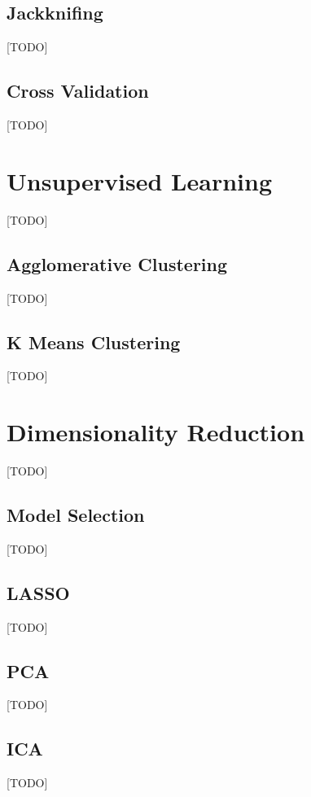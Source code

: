 \documentclass[12pt,a4paper]{article}
\theoremstyle{plain}
\theoremstyle{definition}
\begin{document}
\subsection{Jackknifing}
\label{sec:jackknife}
[TODO]




\subsection{Cross Validation}
\label{sec:cv}
[TODO]


\section{Unsupervised Learning}
\label{sec:unsupervised}
[TODO]


\subsection{Agglomerative Clustering}
[TODO]

\subsection{K Means Clustering}
[TODO]



\section{Dimensionality Reduction}
\label{sec:dim_reduce}
[TODO]

\subsection{Model Selection}
[TODO]

\subsection{LASSO}
[TODO]

\subsection{PCA}
[TODO]

\subsection{ICA}
[TODO]
\end{document}
